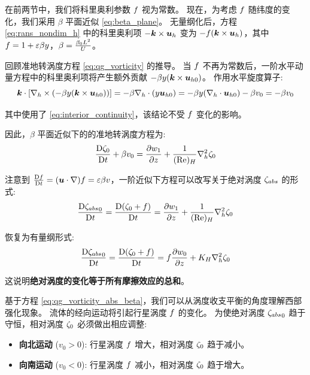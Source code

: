在前两节中，我们将科里奥利参数 $f$ 视为常数。
现在，为考虑 $f$ 随纬度的变化，我们采用 $\beta$ 平面近似 \eqref{eq:beta_plane}。
无量纲化后，方程 \eqref{eq:rans_nondim_h} 中的科里奥利项 $-\bm{k} \times \bm{u}_h$ 变为 $-f (\bm{k} \times \bm{u}_h)$，其中 $f = 1 + \varepsilon \beta y$，$\beta = \frac{\beta_0 L^2}{U}$。

回顾准地转涡度方程 \eqref{eq:qg_vorticity} 的推导。
当 $f$ 不再为常数后，一阶水平动量方程中的科里奥利项将产生额外贡献 $-\beta y (\bm{k} \times \bm{u}_{h0})$。
作用水平旋度算子:
\begin{equation*}
    \bm{k} \cdot [\nabla_h \times (-\beta y (\bm{k} \times \bm{u}_{h0}))] = -\beta \nabla_h \cdot (y \bm{u}_{h0}) = -\beta y (\nabla_h \cdot \bm{u}_{h0}) - \beta v_0 = -\beta v_0
\end{equation*}

其中使用了 \eqref{eq:interior_continuity}，该结论不受 $f$ 变化的影响。

因此，$\beta$ 平面近似下的的准地转涡度方程为:
\begin{equation}
    \matderiv{\relvort_0} + \rossby v_0 = \pde{w_1}{z} + \frac{1}{(\re)_H} \nabla_h^2 \relvort_0
    \label{eq:qg_vorticity_beta_nodim}
\end{equation}

注意到 $\frac{\mathrm{D} f}{\mathrm{D} t} = (\bm{u} \cdot \nabla) f = \varepsilon \beta v$，一阶近似下方程可以改写关于绝对涡度 $\zeta_{abs}$ 的形式:
\begin{equation}
    \matderiv{{\absvort}_0} = \matderiv{(\relvort_0 + \coriolis)} = \pde{w_1}{z} + \frac{1}{(\re)_H} \nabla_h^2 \relvort_0
    \label{eq:qg_vorticity_abs_beta_nodim}
\end{equation}

恢复为有量纲形式:
\begin{equation}
    \matderiv{{\absvort}_0} = \matderiv{(\relvort_0 + \coriolis)} = \coriolis \pde{w_0}{z} + \eddyvisch \nabla_h^2 \relvort_0
    \label{eq:qg_vorticity_abs_beta}
\end{equation}

这说明\textbf{绝对涡度的变化等于所有摩擦效应的总和}。

基于方程 \eqref{eq:qg_vorticity_abs_beta}，我们可以从涡度收支平衡的角度理解西部强化现象。
流体的经向运动将引起行星涡度 $f$ 的变化。
为使绝对涡度 ${\zeta_{abs}}_0$ 趋于守恒，相对涡度 $\zeta_0$ 必须做出相应调整:
\begin{itemize}
    \item \textbf{向北运动} ($v_0 > 0$): 行星涡度 $f$ 增大，相对涡度 $\zeta_0$ 趋于减小。
    \item \textbf{向南运动} ($v_0 < 0$): 行星涡度 $f$ 减小，相对涡度 $\zeta_0$ 趋于增大。
\end{itemize}

